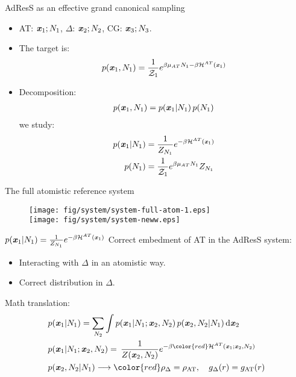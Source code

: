 \documentclass{beamer}
\newcommand{\redc}[1]{{\color{red} #1}}
\newcommand{\vect}[1]{\textbf{\textit{#1}}}
\newcommand{\dd}[1]{\textrm{d}}
\newcommand{\AT}{{\textrm{{AT}}}}
\newcommand{\CG}{{\textrm{CG}}}
\newcommand{\HY}{{\Delta}}
\begin{document}
\begin{frame}{AdResS as an effective grand canonical sampling}
  \begin{itemize}
  \item<1->     \AT: $\vect x_1; N_1$,
    $\HY$: $\vect x_2; N_2$,
    \CG: $\vect x_3; N_3$.\\
  \item <2-> 
    The target is:
    \begin{align*}
      p(\vect x_1, N_1) = \frac{1}{\mathcal Z_1}
      e^{\beta\mu_{AT} N_1 - \beta \mathcal H^{AT}(\vect x_1)} 
    \end{align*}
  \item <3-> Decomposition:
    \begin{align*}
      p(\vect x_1, N_1) = p(\vect x_1 | N_1) \,{p (N_1)}
    \end{align*}
    we study:
    \redc{
    \begin{align*}
      p(\vect x_1 | N_1) &= \frac{1}{Z_{N_1}} e^{-\beta \mathcal H^{AT}(\vect x_1)} \\
      p(N_1) &= \frac{1}{\mathcal Z_1}e^{\beta\mu_{AT} N_1}Z_{N_1}
    \end{align*}}
  \end{itemize}  
\end{frame}

\begin{frame} {The full atomistic reference system}
  \begin{figure}
    \centering 
    \texttt{[image: fig/system/system-full-atom-1.eps]}\\
    \vfill
    \texttt{[image: fig/system/system-neww.eps]}
  \end{figure}      
\end{frame}

\begin{frame}{$p(\vect x_1 | N_1)= \frac{1}{Z_{N_1}} e^{-\beta \mathcal H^{AT}(\vect x_1)} $}
  \vfill
  Correct embedment of AT in the AdResS system:
  \begin{itemize}
  \item Interacting with $\HY$ in an \redc{atomistic way}.
  \item \redc{Correct distribution} in $\HY$.
  \end{itemize}
  \vfill
  Math translation:
    \begin{align*}
      &p(\vect x_1 | N_1) = \sum_{N_2}\int
      p(\vect x_1 | N_1; \vect x_2, N_2) \,
      p(\vect x_2, N_2 | N_1)
      \,\dd d\vect x_2\\
      &p(\vect x_1 | N_1; \vect x_2, N_2)
      = \, \frac 1{Z(\vect x_2, N_2)}
      e^{-\beta\redc{\mathcal H^{AT}(\vect x_1; \vect x_2, N_2)}}\\
      &p(\vect x_2, N_2 | N_1)
      \longrightarrow
      \redc{\rho_\HY = \rho_\AT,\quad
      g_\HY(r) = g_\AT(r)}
    \end{align*}
  \vfill
\end{frame}
\end{document}
